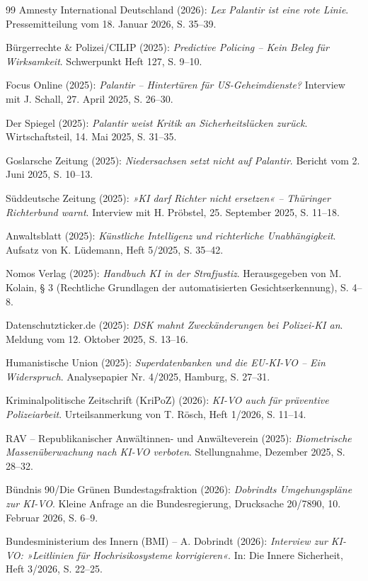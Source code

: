 \documentclass[12pt,a4paper]{article}
\begin{document}
\begin{thebibliography}{99}
		 Amnesty International Deutschland (2026): \emph{Lex Palantir ist eine rote Linie}. Pressemitteilung vom 18. Januar 2026, S. 35–39.
		
		 Bürgerrechte \& Polizei/CILIP (2025): \emph{Predictive Policing – Kein Beleg für Wirksamkeit}. Schwerpunkt Heft 127, S. 9–10.
		
		 Focus Online (2025): \emph{Palantir – Hintertüren für US-Geheimdienste?} Interview mit J. Schall, 27. April 2025, S. 26–30.
		
		 Der Spiegel (2025): \emph{Palantir weist Kritik an Sicherheitslücken zurück}. Wirtschaftsteil, 14. Mai 2025, S. 31–35.
		
		 Goslarsche Zeitung (2025): \emph{Niedersachsen setzt nicht auf Palantir}. Bericht vom 2. Juni 2025, S. 10–13.
		
		 Süddeutsche Zeitung (2025): \emph{»KI darf Richter nicht ersetzen« – Thüringer Richterbund warnt}. Interview mit H. Pröbstel, 25. September 2025, S. 11–18.
		
		 Anwaltsblatt (2025): \emph{Künstliche Intelligenz und richterliche Unabhängigkeit}. Aufsatz von K. Lüdemann, Heft 5/2025, S. 35–42.
		
		 Nomos Verlag (2025): \emph{Handbuch KI in der Strafjustiz}. Herausgegeben von M. Kolain, § 3 (Rechtliche Grundlagen der automatisierten Gesichtserkennung), S. 4–8.
		
		 Datenschutzticker.de (2025): \emph{DSK mahnt Zweckänderungen bei Polizei-KI an}. Meldung vom 12. Oktober 2025, S. 13–16.
		
		 Humanistische Union (2025): \emph{Superdatenbanken und die EU-KI-VO – Ein Widerspruch}. Analysepapier Nr. 4/2025, Hamburg, S. 27–31.
		
		 Kriminalpolitische Zeitschrift (KriPoZ) (2026): \emph{KI-VO auch für präventive Polizeiarbeit}. Urteilsanmerkung von T. Rösch, Heft 1/2026, S. 11–14.
		
		 RAV – Republikanischer Anwältinnen- und Anwälteverein (2025): \emph{Biometrische Massenüberwachung nach KI-VO verboten}. Stellungnahme, Dezember 2025, S. 28–32.
		
		 Bündnis 90/Die Grünen Bundestagsfraktion (2026): \emph{Dobrindts Umgehungspläne zur KI-VO}. Kleine Anfrage an die Bundesregierung, Drucksache 20/7890, 10. Februar 2026, S. 6–9.
		
		 Bundesministerium des Innern (BMI) – A. Dobrindt (2026): \emph{Interview zur KI-VO: »Leitlinien für Hochrisikosysteme korrigieren«}. In: Die Innere Sicherheit, Heft 3/2026, S. 22–25.
		
	\end{thebibliography}
	
\end{document}
